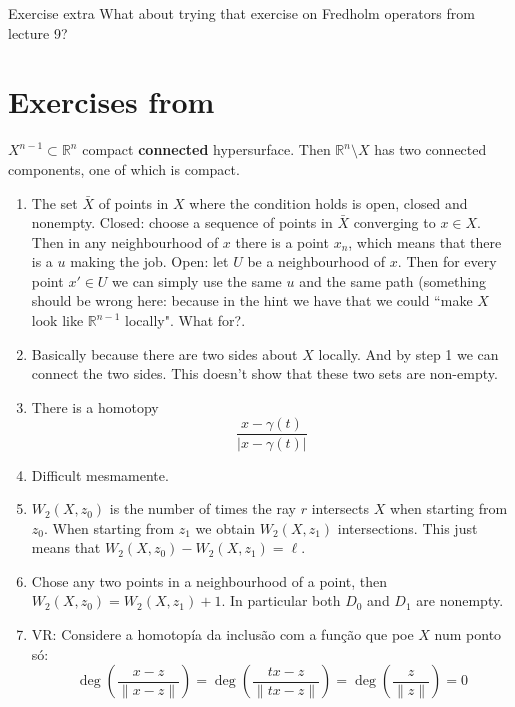 \begin{thing4}{Exercise extra}\label{exer:extra}\leavevmode
What about trying that exercise on Fredholm operators from lecture 9?
\end{thing4}

\section{Exercises from \cite{gui}}

\begin{thm}\leavevmode
\(X^{n-1} \subset \mathbb{R}^n\) compact \textbf{connected} hypersurface. Then \(\mathbb{R}^n\setminus X\) has two connected components, one of which is compact.
\end{thm}
	\begin{enumerate}[label=\textbf{Step \arabic*}]
	\item The set \(\bar{X}\) of points in \(X\) where the condition holds is open, closed and nonempty. Closed: choose a sequence of points in \(\bar{X}\) converging to \(x \in X\). Then in any neighbourhood of \(x\) there is a point \(x_n\), which means that there is a \(u\) making the job. Open: let \(U\) be a neighbourhood of \(x\). Then for every point \( x'\in U\) we can simply use the same \(u\) and the same path {\color{2}(something should be wrong here: because in the hint we have that we could ``make \(X\) look like \(\mathbb{R}^{n-1}\) locally". What for?}.
	\item Basically because there are two sides about \(X\) locally. And by step 1 we can connect the two sides. {\color{6}This doesn't show that these two sets are non-empty.}
	\item There is a homotopy
		\[\frac{x-\gamma(t)}{|x - \gamma (t)|}\]
		
	\item Difficult mesmamente.
	\item \(W_2(X,z_0)\) is the number of times the ray \(r\) intersects \(X\) when starting from \(z_0\). When starting from \(z_1\) we obtain \(W_2(X,z_1)\) intersections. This just means that \(W_2(X,z_0)-W_2(X,z_1)=\ell\).
	\item Chose any two points in a neighbourhood of a point, then \(W_2(X,z_0)=W_2(X,z_1)+1\). In particular both \(D_0\) and \(D_1\) are nonempty.
	\item VR: Considere a homotopía da inclusão com a função que poe \(X\) num ponto só:
		\[\operatorname{deg}\left(\frac{x-z}{\|x-z\|}\right) =\operatorname{deg}\left(\frac{t x -z}{\|t x -z\|}\right) =\operatorname{deg}\left(\frac{z}{\|z\|}\right) =0\]
		

\end{enumerate}
